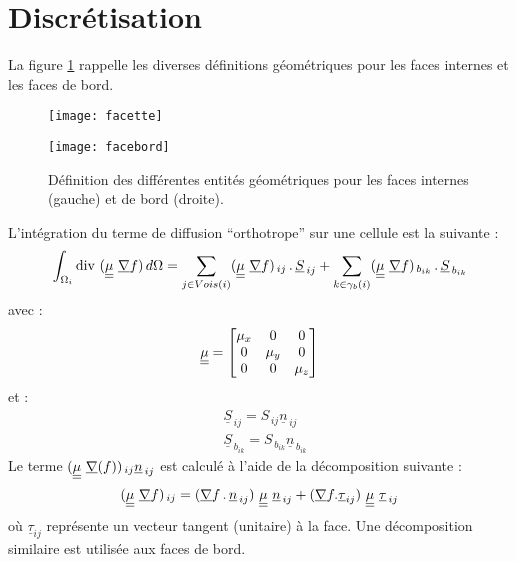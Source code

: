 \section*{Discr\'etisation} \label{Base_Visort_paragraphe2}
La figure \ref{Base_Visort_fig_geom} rappelle les diverses d\'efinitions g\'eom\'etriques
pour les faces internes et les faces de bord.

\begin{figure}[h]
\parbox{8cm}{%
\centerline{\texttt{[image: facette]}}}
\parbox{8cm}{%
\centerline{\texttt{[image: facebord]}}}
\caption{\label{Base_Visort_fig_geom}D\'efinition des diff\'erentes entit\'es
g\'eom\'etriques pour les faces internes (gauche) et de bord (droite).}
\end{figure}
L'intégration du terme de diffusion ``orthotrope'' sur une cellule est la
suivante :
\begin{equation}
\int_{\Omega_i}\text{div}\, \,(\underline{\underline{\mu}}\ \underline{\nabla} f)\,d\Omega =\sum\limits_{j \in
Vois(i)}( \underline{\underline{\mu}}\ \underline{\nabla} f)_{\,ij}\,.\,\underline{S}_{\,ij} + \sum\limits_{k \in
\gamma_b(i)}( \underline{\underline{\mu}}\ \underline{\nabla} f)_{\,b_{ik}}\,.\,\underline{S}_{\,b_{ik}}
\end{equation}
avec :
\begin{equation}
\underline{\underline{\mu}}=\begin{bmatrix}\mu_x & 0 & 0 \\ 0 & \mu_y & 0 \\ 0 & 0 & \mu_z \end{bmatrix}
\end{equation}
et :
\begin{equation}
\begin{array}{ll}
&\underline{S}_{\,ij} = S_{\,ij} \underline{n}_{\,ij} \\
&\underline{S}_{\,b_{ik}} = S_{\,b_{ik}} \underline{n}_{\,b_{ik}}
\end{array}
\end{equation}
Le terme $(\tens{\mu}\ \grad(f))_{\,ij}\underline{n}_{\,ij}$ est calculé à
l'aide de la décomposition suivante :
\begin{equation}
(\tens{\mu}\ \grad f)_{\,ij} = (\grad f \,.\,\underline{n}_{\,ij})\ \tens{\mu}\
\underline{n}_{\,ij}+
(\grad f .\underline{\tau}_{ij})\ \tens{\mu}\ \underline{\tau}_{\,ij}
\end{equation}
o\`u $\underline{\tau}_{ij}$ représente un vecteur tangent (unitaire) à
la face. Une décomposition similaire est utilisée aux faces de bord.\\
